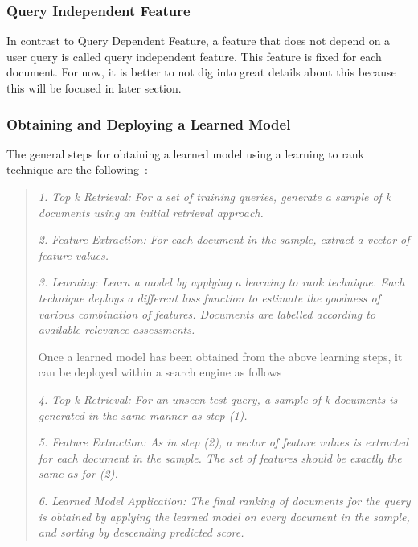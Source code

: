 \subsubsection*{Query Independent Feature}\label{section:queryindependent}
In contrast to Query Dependent Feature, a feature that does not depend on a user query is called query independent feature. This feature is fixed for each
document. For now, it is better to not dig into great details about this because this will be focused in later section.

\subsubsection*{Obtaining and Deploying a Learned Model} \label{sec:learnedmodel}
The general steps for obtaining a learned model using a learning to rank technique are the following~\cite[P. 4]{learningmodel}:

\begin{quote}
  \item \textit{1. Top k Retrieval: For a set of training queries, generate a sample of k documents using an initial retrieval approach.}
  \item \textit{2. Feature Extraction: For each document in the sample, extract a vector of feature values.}
  \item \textit{3. Learning: Learn a model by applying a learning to rank technique. Each technique deploys a different loss function to estimate the goodness of
	various combination of features. Documents are labelled according to available relevance assessments.}

Once a learned model has been obtained from the above learning steps, it can be deployed within a search engine as follows~\cite[P. 4]{learningmodel}

 \item \textit{4. Top k Retrieval: For an unseen test query, a sample of k documents is generated in the same manner as step (1).}
 \item \textit{5. Feature Extraction: As in step (2), a vector of feature values is extracted for each document in the sample. The set of features should be exactly
	the same as for (2).}
 \item \textit{6. Learned Model Application: The final ranking of documents for the query is obtained by applying the learned model on every document in the sample,
	and sorting by descending predicted score.}
\end{quote}

